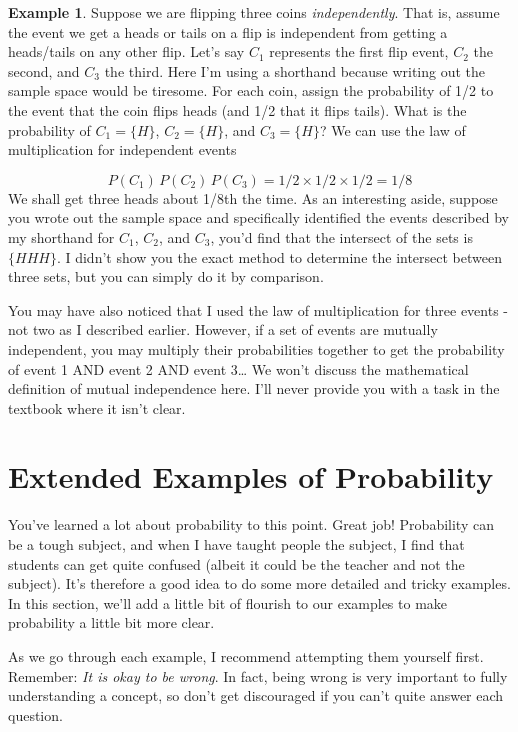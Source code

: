 \documentclass[
]{book}
\theoremstyle{definition}
\theoremstyle{definition}
\newtheorem{example}{Example}[chapter]
\theoremstyle{definition}
\theoremstyle{definition}
\theoremstyle{remark}
\begin{document}
\begin{example}
\protect\hypertarget{exm:coins}{}\label{exm:coins}Suppose we are flipping three coins \emph{independently}. That is, assume the event we get a heads or tails on a flip is independent from getting a heads/tails on any other flip. Let's say \(C_1\) represents the first flip event, \(C_2\) the second, and \(C_3\) the third. Here I'm using a shorthand because writing out the sample space would be tiresome. For each coin, assign the probability of 1/2 to the event that the coin flips heads (and 1/2 that it flips tails). What is the probability of \(C_1 = \{H\}\), \(C_2 = \{H\}\), and \(C_3 = \{H\}\)? We can use the law of multiplication for independent events

\[
P(C_1)\,P(C_2)\,P(C_3)= 1/2 \times 1/2 \times 1/2 = 1/8
\]
We shall get three heads about 1/8th the time. As an interesting aside, suppose you wrote out the sample space and specifically identified the events described by my shorthand for \(C_1\), \(C_2\), and \(C_3\), you'd find that the intersect of the sets is \(\{HHH\}\). I didn't show you the exact method to determine the intersect between three sets, but you can simply do it by comparison.

You may have also noticed that I used the law of multiplication for three events - not two as I described earlier. However, if a set of events are mutually independent, you may multiply their probabilities together to get the probability of event 1 AND event 2 AND event 3\ldots{} We won't discuss the mathematical definition of mutual independence here. I'll never provide you with a task in the textbook where it isn't clear.
\end{example}

\section{Extended Examples of Probability}\label{extended-examples-of-probability}

You've learned a lot about probability to this point. Great job! Probability can be a tough subject, and when I have taught people the subject, I find that students can get quite confused (albeit it could be the teacher and not the subject). It's therefore a good idea to do some more detailed and tricky examples. In this section, we'll add a little bit of flourish to our examples to make probability a little bit more clear.

As we go through each example, I recommend attempting them yourself first. Remember: \emph{It is okay to be wrong}. In fact, being wrong is very important to fully understanding a concept, so don't get discouraged if you can't quite answer each question.
\end{document}
